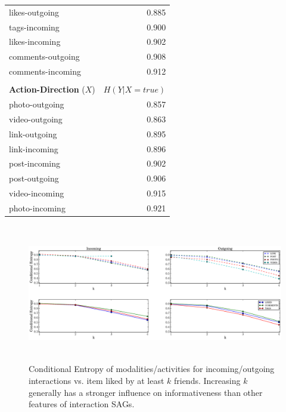 \begin{table}
{\begin{tabular}{| >{\small}l | >{\small}r | }
		likes-outgoing & 0.885 \\
		tags-incoming & 0.900 \\
		likes-incoming & 0.902 \\
		comments-outgoing & 0.908 \\
		comments-incoming & 0.912 \\
		\hline
\multicolumn{2}{c}{}\\
                \hline	
		\textbf{Action-Direction} ($X$) & $H(Y|X=true)$ \\
		\hline
		photo-outgoing & 0.857 \\
		video-outgoing & 0.863 \\
		link-outgoing & 0.895 \\
		link-incoming & 0.896 \\
		post-incoming & 0.902 \\
		post-outgoing & 0.906 \\
		video-incoming & 0.915 \\
		photo-incoming & 0.921 \\
		\hline
				
	\end{tabular}}
\end{table}

\begin{figure}[tbp!]
\centering
\hspace{-3mm}\includegraphics[height=60mm,width=180mm]{data/newPlots/ModalityActionsvsKFriends.eps}
\vspace{-6mm}
\caption{Conditional Entropy  of modalities/activities for incoming/outgoing interactions vs. item liked by at least $k$ friends.  Increasing $k$ generally has a stronger influence on informativeness than other features of interaction SAGs.}
\label{Fig2}
\end{figure}

